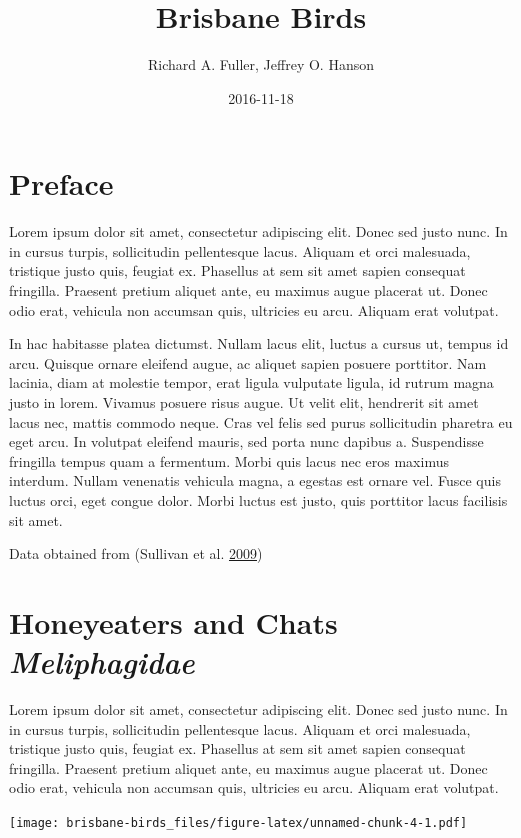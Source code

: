 \documentclass[]{book}
\title{Brisbane Birds}
\author{Richard A. Fuller, Jeffrey O. Hanson}
\date{2016-11-18}
\begin{document}
\maketitle

{
\setcounter{tocdepth}{1}
\tableofcontents
}
\chapter{Preface}\label{preface}

Lorem ipsum dolor sit amet, consectetur adipiscing elit. Donec sed justo
nunc. In in cursus turpis, sollicitudin pellentesque lacus. Aliquam et
orci malesuada, tristique justo quis, feugiat ex. Phasellus at sem sit
amet sapien consequat fringilla. Praesent pretium aliquet ante, eu
maximus augue placerat ut. Donec odio erat, vehicula non accumsan quis,
ultricies eu arcu. Aliquam erat volutpat.

In hac habitasse platea dictumst. Nullam lacus elit, luctus a cursus ut,
tempus id arcu. Quisque ornare eleifend augue, ac aliquet sapien posuere
porttitor. Nam lacinia, diam at molestie tempor, erat ligula vulputate
ligula, id rutrum magna justo in lorem. Vivamus posuere risus augue. Ut
velit elit, hendrerit sit amet lacus nec, mattis commodo neque. Cras vel
felis sed purus sollicitudin pharetra eu eget arcu. In volutpat eleifend
mauris, sed porta nunc dapibus a. Suspendisse fringilla tempus quam a
fermentum. Morbi quis lacus nec eros maximus interdum. Nullam venenatis
vehicula magna, a egestas est ornare vel. Fusce quis luctus orci, eget
congue dolor. Morbi luctus est justo, quis porttitor lacus facilisis sit
amet.

Data obtained from (Sullivan et al. \protect\hyperlink{ref-r1}{2009})

\chapter{\texorpdfstring{Honeyeaters and Chats
\emph{Meliphagidae}}{Honeyeaters and Chats Meliphagidae}}\label{honeyeaters-and-chats-meliphagidae}

Lorem ipsum dolor sit amet, consectetur adipiscing elit. Donec sed justo
nunc. In in cursus turpis, sollicitudin pellentesque lacus. Aliquam et
orci malesuada, tristique justo quis, feugiat ex. Phasellus at sem sit
amet sapien consequat fringilla. Praesent pretium aliquet ante, eu
maximus augue placerat ut. Donec odio erat, vehicula non accumsan quis,
ultricies eu arcu. Aliquam erat volutpat.

\texttt{[image: brisbane-birds\_files/figure-latex/unnamed-chunk-4-1.pdf]}
\end{document}
